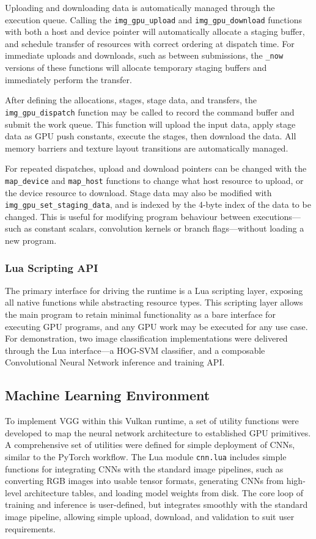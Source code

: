\documentclass[10pt, a4paper]{article}
\begin{document}
Uploading and downloading data is automatically managed through the execution queue. Calling the \texttt{img\_gpu\_upload} and \texttt{img\_gpu\_download} functions with both a host and device pointer will automatically allocate a staging buffer, and schedule transfer of resources with correct ordering at dispatch time. For immediate uploads and downloads, such as between submissions, the \texttt{\_now} versions of these functions will allocate temporary staging buffers and immediately perform the transfer.

After defining the allocations, stages, stage data, and transfers, the \texttt{img\_gpu\_dispatch} function may be called to record the command buffer and submit the work queue. This function will upload the input data, apply stage data as GPU push constants, execute the stages, then download the data. All memory barriers and texture layout transitions are automatically managed.

For repeated dispatches, upload and download pointers can be changed with the \texttt{map\_device} and \texttt{map\_host} functions to change what host resource to upload, or the device resource to download. Stage data may also be modified with \texttt{img\_gpu\_set\_staging\_data}, and is indexed by the 4-byte index of the data to be changed. This is useful for modifying program behaviour between executions---such as constant scalars, convolution kernels or branch flags---without loading a new program.

\subsubsection{Lua Scripting API}
The primary interface for driving the runtime is a Lua scripting layer, exposing all native functions while abstracting resource types. This scripting layer allows the main program to retain minimal functionality as a bare interface for executing GPU programs, and any GPU work may be executed for any use case. For demonstration, two image classification implementations were delivered through the Lua interface---a HOG-SVM classifier, and a composable Convolutional Neural Network inference and training API.

\subsection{Machine Learning Environment}
To implement VGG within this Vulkan runtime, a set of utility functions were developed to map the neural network architecture to established GPU primitives. A comprehensive set of utilities were defined for simple deployment of CNNs, similar to the PyTorch workflow. The Lua module \texttt{cnn.lua} includes simple functions for integrating CNNs with the standard image pipelines, such as converting RGB images into usable tensor formats, generating CNNs from high-level architecture tables, and loading model weights from disk. The core loop of training and inference is user-defined, but integrates smoothly with the standard image pipeline, allowing simple upload, download, and validation to suit user requirements. 
\end{document}
